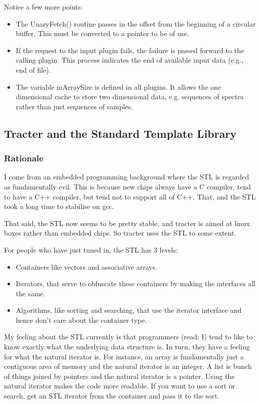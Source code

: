 Notice a few more points:
\begin{itemize}
\item The UnaryFetch() routine passes in the offset from the beginning
  of a circular buffer.  This must be converted to a pointer to be of
  use.
\item If the request to the input plugin fails, the failure is passed
  forward to the calling plugin.  This process indicates the end of
  available input data (e.g., end of file).
\item The variable mArraySize is defined in all plugins.  It allows
  the one dimensional cache to store two dimensional data, e.g.
  sequences of spectra rather than just sequences of samples.
\end{itemize}

\subsection{Tracter and the Standard Template Library}

\subsubsection{Rationale}

I come from an embedded programming background where the STL is
regarded as fundamentally evil.  This is because new chips always have
a C compiler, tend to have a C++ compiler, but tend not to support all
of C++.  That, and the STL took a long time to stabilise on gcc.

That said, the STL now seems to be pretty stable, and tracter is aimed
at linux boxes rather than embedded chips.  So tracter uses the STL to
some extent.

For people who have just tuned in, the STL has 3 levels:
\begin{itemize}
\item Containers like vectors and associative arrays.
\item Iterators, that serve to obfuscate these containers by making
  the interfaces all the same.
\item Algorithms, like sorting and searching, that use the iterator
  interface and hence don't care about the container type.
\end{itemize}

My feeling about the STL currently is that programmers (read: I) tend
to like to know exactly what the underlying data structure is.  In
turn, they have a feeling for what the natural iterator is.  For
instance, an array is fundamentally just a contiguous area of memory
and the natural iterator is an integer.  A list is bunch of things
joined by pointers and the natural iterator is a pointer.  Using the
natural iterator makes the code more readable.  If you want to use a
sort or search, get an STL iterator from the container and pass it to
the sort.


